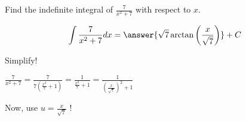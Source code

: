 \documentclass{ximera}
\author{Gregory Hartman \and Matthew Carr\and Nela Lakos}
\begin{document}
\begin{exercise}

Find the indefinite integral of $\frac{7}{x^2+7}$ with respect to $x$.

\[
\int \frac{7}{x^2+7} dx=\answer{\sqrt{7}\arctan\left(\frac{x}{\sqrt{7}}\right)}+C
\]
\begin{hint}
Simplify!
\end{hint}
\begin{hint}
$\frac{7}{x^2+7}=\frac{7}{7(\frac{x^2}{7}+1)}=\frac{1}{\frac{x^2}{7}+1}=\frac{1}{\left(\frac{x}{\sqrt{7}}\right)^2+1}$
\end{hint}
\begin{hint}
Now, use $u=\frac{x}{\sqrt{7}}$ !
\end{hint}
\end{exercise}
\end{document}
